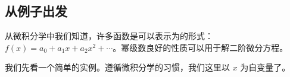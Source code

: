 


\subsection{从例子出发}

从微积分学中我们知道，许多函数是可以表示为的形式：$f(x)=a_0+a_1x+a_2x^2+\cdots$。幂级数良好的性质可以用于解二阶微分方程。

我们先看一个简单的实例。遵循微积分学的习惯，我们这里以 $x$ 为自变量了。

